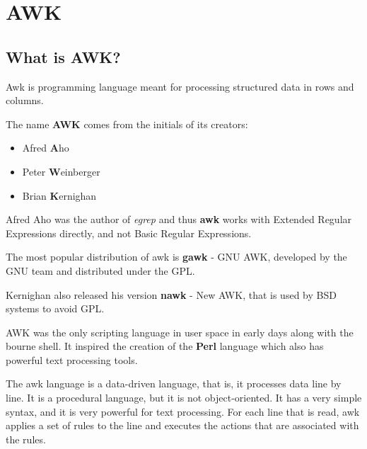 \chapter{AWK}

\section{What is AWK?}

Awk is programming language meant for processing structured data in rows and columns.


The name \textbf{AWK} comes from the initials of its creators:
\begin{itemize}
\item Afred \textbf{A}ho
\item Peter \textbf{W}einberger
\item Brian \textbf{K}ernighan
\end{itemize}

\begin{remark}
  Afred Aho was the author of \textit{egrep} and thus \textbf{awk} works with Extended Regular Expressions directly, and not Basic Regular Expressions.
\end{remark}

The most popular distribution of awk is \textbf{gawk} - GNU AWK, developed by the GNU team and distributed under the GPL.

Kernighan also released his version \textbf{nawk} - New AWK, that is used by BSD systems to avoid GPL.

AWK was the only scripting language in user space in early days along with the bourne shell. It inspired the creation of the \textbf{Perl} language which also has powerful text processing tools.

The awk language is a data-driven language, that is, it processes data line by line. It is a procedural language, but it is not object-oriented.
It has a very simple syntax, and it is very powerful for text processing.
For each line that is read, awk applies a set of rules to the line and executes the actions that are associated with the rules.

